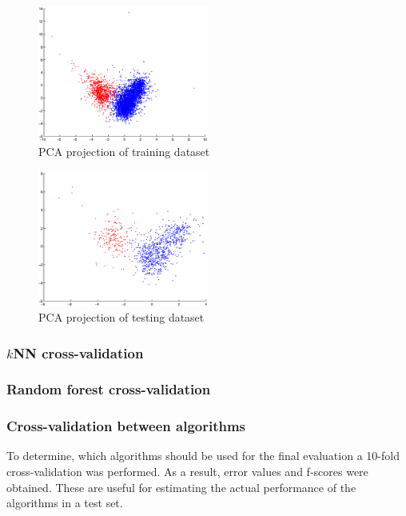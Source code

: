 \documentclass[twoside]{article}
\begin{document}
\begin{multicols}{2}
\begin{figure}[H]
\centering
\includegraphics[width=0.5\textwidth]{trainingpca}
\caption{PCA projection of training dataset}
\label{fig:color_training_pca}
\end{figure}

\begin{figure}[H]
\centering
\includegraphics[width=0.5\textwidth]{testpca}
\caption{PCA projection of testing dataset}
\label{fig:color_testing_pca}
\end{figure}

\subsubsection{$k$NN cross-validation}

\subsubsection{Random forest cross-validation}

\subsubsection{Cross-validation between algorithms}

To determine, which algorithms should be used for the final evaluation a 10-fold cross-validation was performed. As a result, error values and f-scores were obtained.
These are useful for estimating the actual performance of the algorithms in a test set. 


\end{multicols}
\end{document}
